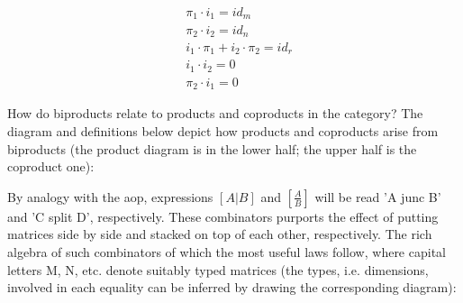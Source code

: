 \documentclass[
  oneside,
  11pt, a4paper,
  footinclude=true,
  headinclude=true,
  cleardoublepage=empty
]{scrbook}
\theoremstyle{definition}
\theoremstyle{definition}
\begin{document}
        \begin{align*}
           &\pi_1 \cdot i_1 = id_m \\
           &\pi_2 \cdot i_2 = id_n \\
           &i_1 \cdot \pi_1 + i_2 \cdot \pi_2 = id_r \\
           &i_1 \cdot i_2 = 0 \\
           &\pi_2 \cdot i_1 = 0
        \end{align*}
        
        How do biproducts relate to products and coproducts in the category? The diagram and definitions below depict how products and coproducts arise from biproducts (the product diagram is in the lower half; the upper half is the coproduct one): 
        
        \begin{center}
        \end{center}{}
        
        By analogy with the \gls{aop}, expressions $\left[A | B\right]$ and $\left[\tfrac{A}{B}\right]$ will be read 'A junc B' and 'C split D', respectively. These combinators purports the effect of putting matrices side by side and stacked on top of each other, respectively. The rich algebra of such combinators of which the most useful laws follow, where capital letters M, N, etc. denote suitably typed matrices (the types, i.e. dimensions, involved in each equality can be inferred by drawing the corresponding diagram):
        
\end{document}

